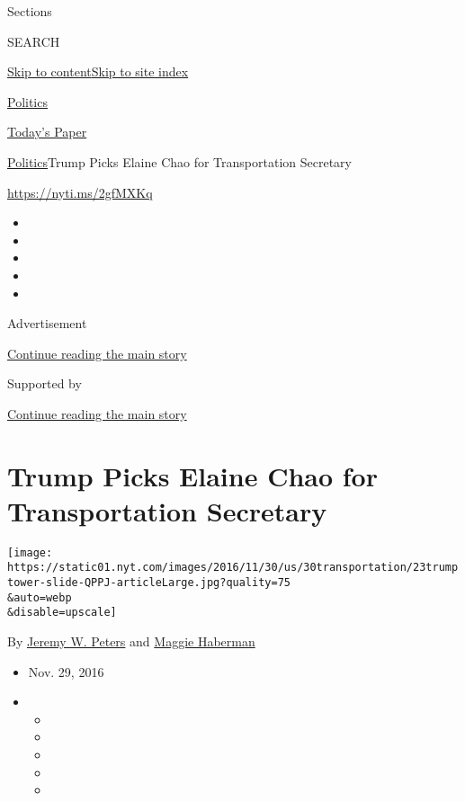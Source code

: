 Sections

SEARCH

\protect\hyperlink{site-content}{Skip to
content}\protect\hyperlink{site-index}{Skip to site index}

\href{https://www.nytimes.com/section/politics}{Politics}

\href{https://myaccount.nytimes.com/auth/login?response_type=cookie\&client_id=vi}{}

\href{https://www.nytimes.com/section/todayspaper}{Today's Paper}

\href{/section/politics}{Politics}\textbar{}Trump Picks Elaine Chao for
Transportation Secretary

\url{https://nyti.ms/2gfMXKq}

\begin{itemize}
\item
\item
\item
\item
\item
\end{itemize}

Advertisement

\protect\hyperlink{after-top}{Continue reading the main story}

Supported by

\protect\hyperlink{after-sponsor}{Continue reading the main story}

\hypertarget{trump-picks-elaine-chao-for-transportation-secretary}{%
\section{Trump Picks Elaine Chao for Transportation
Secretary}\label{trump-picks-elaine-chao-for-transportation-secretary}}

\texttt{[image: https://static01.nyt.com/images/2016/11/30/us/30transportation/23trumptower-slide-QPPJ-articleLarge.jpg?quality=75\\\&auto=webp\\\&disable=upscale]}

By \href{http://www.nytimes.com/by/jeremy-w-peters}{Jeremy W. Peters}
and \href{http://www.nytimes.com/by/maggie-haberman}{Maggie Haberman}

\begin{itemize}
\item
  Nov. 29, 2016
\item
  \begin{itemize}
  \item
  \item
  \item
  \item
  \item
  \end{itemize}
\end{itemize}

